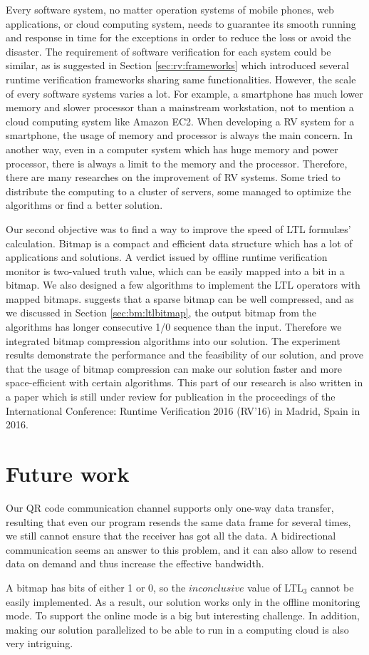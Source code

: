 Every software system, no matter operation systems of mobile phones, web applications, or cloud computing system, needs to guarantee its smooth running and response in time for the exceptions in order to reduce the loss or avoid the disaster. The requirement of software verification for each system could be similar, as is suggested in Section \ref{sec:rv:frameworks} which introduced several runtime verification frameworks sharing same functionalities. However, the scale of every software systems varies a lot. For example, a smartphone has much lower memory and slower processor than a mainstream workstation, not to mention a cloud computing system like Amazon EC2. When developing a RV system for a smartphone, the usage of memory and processor is always the main concern. In another way, even in a computer system which has huge memory and power processor, there is always a limit to the memory and the processor. Therefore, there are many researches on the improvement of RV systems. Some tried to distribute the computing to a cluster of servers, some managed to optimize the algorithms or find a better solution.

Our second objective was to find a way to improve the speed of LTL formul\ae{}s' calculation. Bitmap is a compact and efficient data structure which has a lot of applications and solutions. A verdict issued by offline runtime verification monitor is two-valued truth value, which can be easily mapped into a bit in a bitmap. We also designed a few algorithms to implement the LTL operators with mapped bitmaps. \cite{lemire2014} suggests that a sparse bitmap can be well compressed, and as we discussed in Section \ref{sec:bm:ltlbitmap}, the output bitmap from the algorithms has longer consecutive 1/0 sequence than the input. Therefore we integrated bitmap compression algorithms into our solution. The experiment results demonstrate the performance and the feasibility of our solution, and prove that the usage of bitmap compression can make our solution faster and more space-efficient with certain algorithms. This part of our research is also written in a paper which is still under review for publication in the proceedings of the International Conference: Runtime Verification 2016 (RV'16) in Madrid, Spain in 2016.

\section*{Future work}

Our QR code communication channel supports only one-way data transfer, resulting that even our program resends the same data frame for several times, we still cannot ensure that the receiver has got all the data. A bidirectional communication seems an answer to this problem, and it can also allow to resend data on demand and thus increase the effective bandwidth.

A bitmap has bits of either 1 or 0, so the $inconclusive$ value of LTL$_3$ cannot be easily implemented. As a result, our solution works only in the offline monitoring mode. To support the online mode is a big but interesting challenge. In addition, making our solution parallelized to be able to run in a computing cloud is also very intriguing.